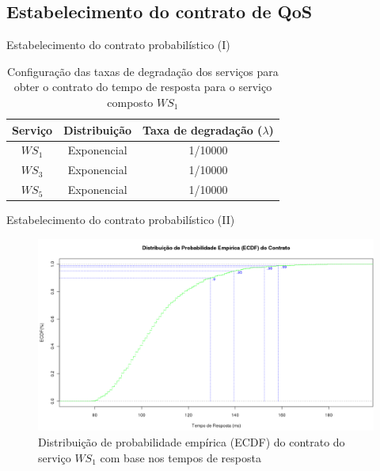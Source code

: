 \documentclass[xcolor=svgnames]{beamer}
\begin{document}
\subsection{Estabelecimento do contrato de QoS}

  \begin{frame}{Estabelecimento do contrato probabilístico (I)}
      \begin{table}[!h]
	    \centering
      {\footnotesize
	    \caption{Configuração das taxas de degradação dos serviços  para obter o contrato do tempo de resposta para o serviço composto $WS_1$ }
	    \label{table:contract_configurations}
	  \begin{tabular}{|c|c|c|}
		\hline
		Serviço    &   Distribuição      &     Taxa de degradação ($\lambda$)      \\
		\hline
		$WS_1$     &    Exponencial      &      1/10000      \\
		$WS_3$     &    Exponencial      &      1/10000      \\
		$WS_5$     &    Exponencial      &      1/10000      \\
		\hline
		\end{tabular}
      }
      \end{table}
  \end{frame}
  

  \begin{frame}{Estabelecimento do contrato probabilístico (II)}
    \begin{figure}[H]
	\centering
	\includegraphics[width=1.0\linewidth]{figures/contract.png}
	\caption{Distribuição de probabilidade empírica (ECDF) do contrato do serviço $WS_1$ com base nos tempos de resposta  }
	\label{figure:contract}
    \end{figure}
  \end{frame}
\end{document}
